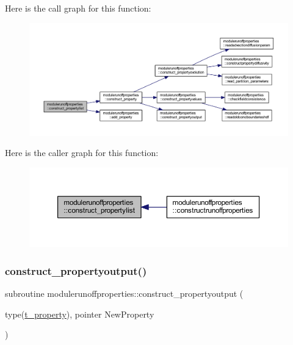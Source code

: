 Here is the call graph for this function\+:\nopagebreak
\begin{figure}[H]
\begin{center}
\leavevmode
\includegraphics[width=350pt]{namespacemodulerunoffproperties_a442b6b1a6a4cd7b5b27b0fe8c4191f4e_cgraph}
\end{center}
\end{figure}
Here is the caller graph for this function\+:\nopagebreak
\begin{figure}[H]
\begin{center}
\leavevmode
\includegraphics[width=350pt]{namespacemodulerunoffproperties_a442b6b1a6a4cd7b5b27b0fe8c4191f4e_icgraph}
\end{center}
\end{figure}
\mbox{\label{namespacemodulerunoffproperties_aaad69eea7f005151f91a94b3105aed34}} 
\subsubsection{\texorpdfstring{construct\+\_\+propertyoutput()}{construct\_propertyoutput()}}
{\footnotesize\ttfamily subroutine modulerunoffproperties\+::construct\+\_\+propertyoutput (\begin{DoxyParamCaption}\item[{type(\mbox{\hyperlink{structmodulerunoffproperties_1_1t__property}{t\+\_\+property}}), pointer}]{New\+Property }\end{DoxyParamCaption})\hspace{0.3cm}{\ttfamily [private]}}

